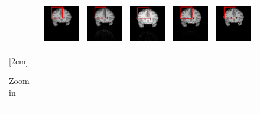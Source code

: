 \documentclass[review]{elsarticle}
\begin{document}
\begin{figure}
\begin{raggedright}
\begin{tabular}{>{\centering}b{0.2cm}lcccc}
{\begin{turn}{90}
						\end{turn}} & \includegraphics[width=2.5cm]{include/grp1/res7_org} & \includegraphics[width=2.5cm]{include/grp1/res7_zero} & \includegraphics[width=2.5cm]{include/grp1/res7_cs_red} & \includegraphics[width=2.5cm]{include/grp1/res7_L2_red} & \includegraphics[width=2.5cm]{include/grp1/res7_our}\tabularnewline
						\multirow{1}{0.2cm}[2cm]{\begin{turn}{90}
								{\footnotesize{}Zoom in}

\end{turn}}
\end{tabular}
\end{raggedright}
\end{figure}
\end{document}
